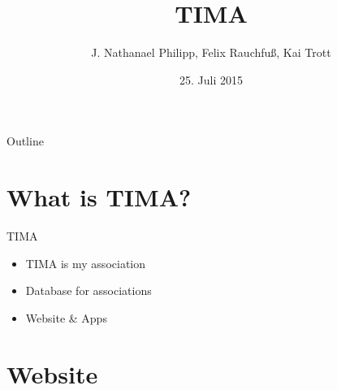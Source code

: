 \documentclass[11pt]{beamer}
\author{J. Nathanael Philipp, Felix Rauchfuß, Kai Trott}
\title{TIMA}
\date{25. Juli 2015}
\institute{Universität Leipzig}
\begin{document}
\section{}
\begin{frame}
\titlepage
\end{frame}

\begin{frame}{Outline}
	\tableofcontents
\end{frame}

\section{What is TIMA?}
\begin{frame}{TIMA}
	\begin{itemize}
		\item TIMA is my association
		\item Database for associations
		\item Website \& Apps
	\end{itemize}
\end{frame}

\section{Website}
\end{document}
